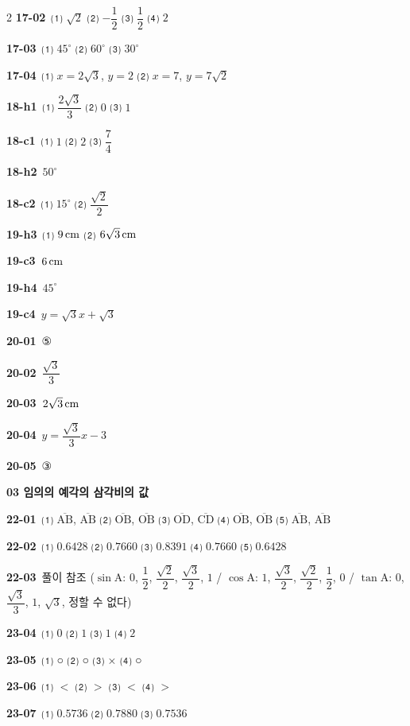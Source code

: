 \documentclass[10pt,a4paper]{article}
\newcommand{\pt}[1]{\mathrm{#1}}
\newcommand{\seg}[1]{\overline{\mathrm{#1}}}
\begin{document}
\begin{multicols}{2}
\noindent\textbf{17-02}\ ⑴ $\sqrt{2}$ ⑵ $-\dfrac{1}{2}$ ⑶ $\dfrac{1}{2}$ ⑷ $2$\par
\noindent\textbf{17-03}\ ⑴ $45^\circ$ ⑵ $60^\circ$ ⑶ $30^\circ$\par
\noindent\textbf{17-04}\ ⑴ $x=2\sqrt{3}$, $y=2$ ⑵ $x=7$, $y=7\sqrt{2}$\par
\noindent\textbf{18-h1}\ ⑴ $\dfrac{2\sqrt{3}}{3}$ ⑵ $0$ ⑶ $1$\par
\noindent\textbf{18-c1}\ ⑴ $1$ ⑵ $2$ ⑶ $\dfrac{7}{4}$\par
\noindent\textbf{18-h2}\ $50^\circ$\par
\noindent\textbf{18-c2}\ ⑴ $15^\circ$ ⑵ $\dfrac{\sqrt{2}}{2}$\par
\noindent\textbf{19-h3}\ ⑴ $9\mkern3mu \mathrm{cm}$ ⑵ $6\sqrt{3}\mkern3mu \mathrm{cm}$\par
\noindent\textbf{19-c3}\ $6\mkern3mu \mathrm{cm}$\par
\noindent\textbf{19-h4}\ $45^\circ$\par
\noindent\textbf{19-c4}\ $y=\sqrt{3}x+\sqrt{3}$\par
\noindent\textbf{20-01}\ ⑤\par
\noindent\textbf{20-02}\ $\dfrac{\sqrt{3}}{3}$\par
\noindent\textbf{20-03}\ $2\sqrt{3}\mkern3mu \mathrm{cm}$\par
\noindent\textbf{20-04}\ $y=\dfrac{\sqrt{3}}{3}x-3$\par
\noindent\textbf{20-05}\ ③\par
\noindent\textbf{03 임의의 예각의 삼각비의 값}\par\smallskip
\noindent\textbf{22-01}\ ⑴ $\seg{AB}$, $\seg{AB}$ ⑵ $\seg{OB}$, $\seg{OB}$ ⑶ $\seg{OD}$, $\seg{CD}$ ⑷ $\seg{OB}$, $\seg{OB}$ ⑸ $\seg{AB}$, $\seg{AB}$\par
\noindent\textbf{22-02}\ ⑴ $0.6428$ ⑵ $0.7660$ ⑶ $0.8391$ ⑷ $0.7660$ ⑸ $0.6428$\par
\noindent\textbf{22-03}\ 풀이 참조 ($\sin\pt{A}$: $0$, $\dfrac{1}{2}$, $\dfrac{\sqrt{2}}{2}$, $\dfrac{\sqrt{3}}{2}$, $1$ / $\cos\pt{A}$: $1$, $\dfrac{\sqrt{3}}{2}$, $\dfrac{\sqrt{2}}{2}$, $\dfrac{1}{2}$, $0$ / $\tan\pt{A}$: $0$, $\dfrac{\sqrt{3}}{3}$, $1$, $\sqrt{3}$, 정할 수 없다)\par
\noindent\textbf{23-04}\ ⑴ $0$ ⑵ $1$ ⑶ $1$ ⑷ $2$\par
\noindent\textbf{23-05}\ ⑴ ○ ⑵ ○ ⑶ × ⑷ ○\par
\noindent\textbf{23-06}\ ⑴ $<$ ⑵ $>$ ⑶ $<$ ⑷ $>$\par
\noindent\textbf{23-07}\ ⑴ $0.5736$ ⑵ $0.7880$ ⑶ $0.7536$\par

\end{multicols}
\end{document}
